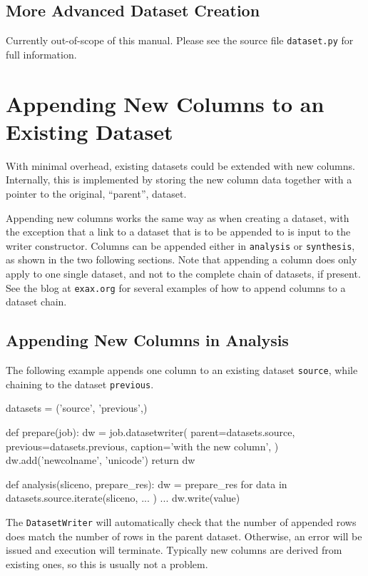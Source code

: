 \subsection{More Advanced Dataset Creation}
Currently out-of-scope of this manual.  Please see the source file
\texttt{dataset.py} for full information.



\section{Appending New Columns to an Existing Dataset}
\label{sec:appending_new_columns}

With minimal overhead, existing datasets could be extended with new
columns.  Internally, this is implemented by storing the new column
data together with a pointer to the original, ``parent'', dataset.

Appending new columns works the same way as when creating a dataset,
with the exception that a link to a dataset that is to be appended to
is input to the writer constructor.  Columns can be appended either
in \texttt{analysis} or \texttt{synthesis}, as shown in the two
following sections.  Note that appending a column does only apply to
one single dataset, and not to the complete chain of datasets, if
present.  See the blog at \texttt{exax.org} for several examples of
how to append columns to a dataset chain.


\subsection{Appending New Columns in Analysis}

The following example appends one column to an existing
dataset \texttt{source}, while chaining to the
dataset \texttt{previous}.
\begin{python}
datasets = ('source', 'previous',)

def prepare(job):
    dw = job.datasetwriter(
        parent=datasets.source,
        previous=datasets.previous,
        caption='with the new column',
    )
    dw.add('newcolname', 'unicode')
    return dw

def analysis(sliceno, prepare_res):
    dw = prepare_res
    for data in datasets.source.iterate(sliceno, ... )
        ...
        dw.write(value)
\end{python}
The \texttt{DatasetWriter} will automatically check that the number of
appended rows does match the number of rows in the parent dataset.
Otherwise, an error will be issued and execution will terminate.
Typically new columns are derived from existing ones, so this is
usually not a problem.

